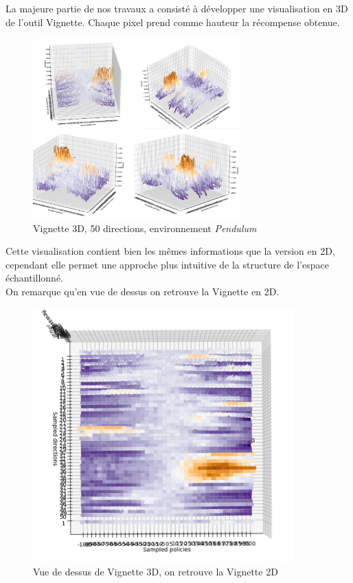 \documentclass[12pt]{article}
\begin{document}
La majeure partie de nos travaux a consisté à développer une visualisation en 3D de l'outil Vignette. Chaque pixel prend comme hauteur la récompense obtenue. \\

\begin{figure}[htp]
    \centering
    \includegraphics[width=8cm]{Images/vignette_3D}
    \caption{Vignette 3D, 50 directions, environnement \emph{Pendulum}}
    \label{fig:vignette3D}
\end{figure}
\newpage
Cette visualisation contient bien les mêmes informations que la version en 2D, cependant elle permet une approche plus intuitive de la structure de l'espace échantillonné. \\

On remarque qu'en vue de dessus on retrouve la Vignette en 2D. \\

\begin{figure}[htp]
    \centering
    \includegraphics[width=10cm]{Images/vignette_dessus}
    \caption{Vue de dessus de Vignette 3D, on retrouve la Vignette 2D}
    \label{fig:vignetteDessus}
\end{figure}
\end{document}
